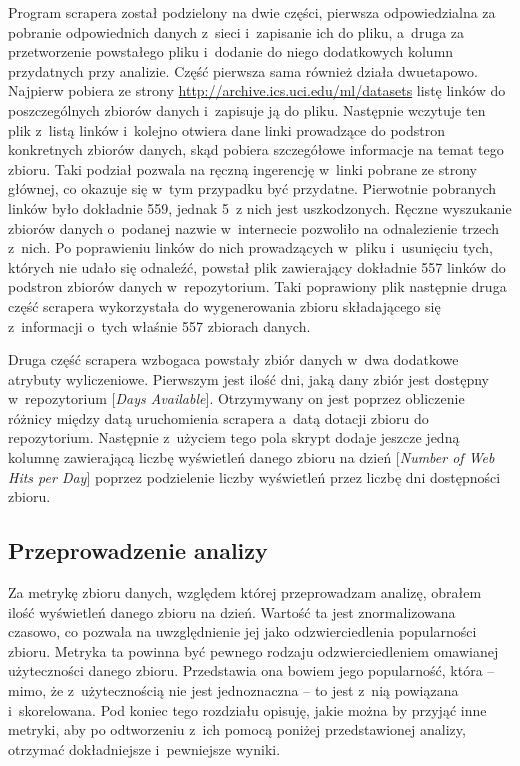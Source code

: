 Program scrapera został podzielony na dwie części, pierwsza odpowiedzialna za pobranie odpowiednich danych z~sieci i~zapisanie ich do pliku, a~druga za przetworzenie powstałego pliku i~dodanie do niego dodatkowych kolumn przydatnych przy analizie.
Część pierwsza sama również działa dwuetapowo.
Najpierw pobiera ze strony \url{http://archive.ics.uci.edu/ml/datasets} listę linków do poszczególnych zbiorów danych i~zapisuje ją do pliku.
Następnie wczytuje ten plik z~listą linków i~kolejno otwiera dane linki prowadzące do podstron konkretnych zbiorów danych, skąd pobiera szczegółowe informacje na temat tego zbioru.
Taki podział pozwala na ręczną ingerencję w~linki pobrane ze strony głównej, co okazuje się w~tym przypadku być przydatne.
Pierwotnie pobranych linków było dokładnie 559, jednak 5~z nich jest uszkodzonych.
Ręczne wyszukanie zbiorów danych o~podanej nazwie w~internecie pozwoliło na odnalezienie trzech z~nich.
Po poprawieniu linków do nich prowadzących w~pliku i~usunięciu tych, których nie udało się odnaleźć, powstał plik zawierający dokładnie 557 linków do podstron zbiorów danych w~repozytorium.
Taki poprawiony plik następnie druga część scrapera wykorzystała do wygenerowania zbioru składającego się z~informacji o~tych właśnie 557 zbiorach danych.

Druga część scrapera wzbogaca powstały zbiór danych w~dwa dodatkowe atrybuty wyliczeniowe.
Pierwszym jest ilość dni, jaką dany zbiór jest dostępny w~repozytorium [\emph{Days Available}].
Otrzymywany on jest poprzez obliczenie różnicy między datą uruchomienia scrapera a~datą dotacji zbioru do repozytorium.
Następnie z~użyciem tego pola skrypt dodaje jeszcze jedną kolumnę zawierającą liczbę wyświetleń danego zbioru na dzień [\emph{Number of Web Hits per Day}] poprzez podzielenie liczby wyświetleń przez liczbę dni dostępności zbioru.

\subsection{Przeprowadzenie analizy}

Za metrykę zbioru danych, względem której przeprowadzam analizę, obrałem ilość wyświetleń danego zbioru na dzień.
Wartość ta jest znormalizowana czasowo, co pozwala na uwzględnienie jej jako odzwierciedlenia popularności zbioru.
Metryka ta powinna być pewnego rodzaju odzwierciedleniem omawianej użyteczności danego zbioru.
Przedstawia ona bowiem jego popularność, która -- mimo, że z~użytecznością nie jest jednoznaczna -- to jest z~nią powiązana i~skorelowana.
Pod koniec tego rozdziału opisuję, jakie można by przyjąć inne metryki, aby po odtworzeniu z~ich pomocą poniżej przedstawionej analizy, otrzymać dokładniejsze i~pewniejsze wyniki.

